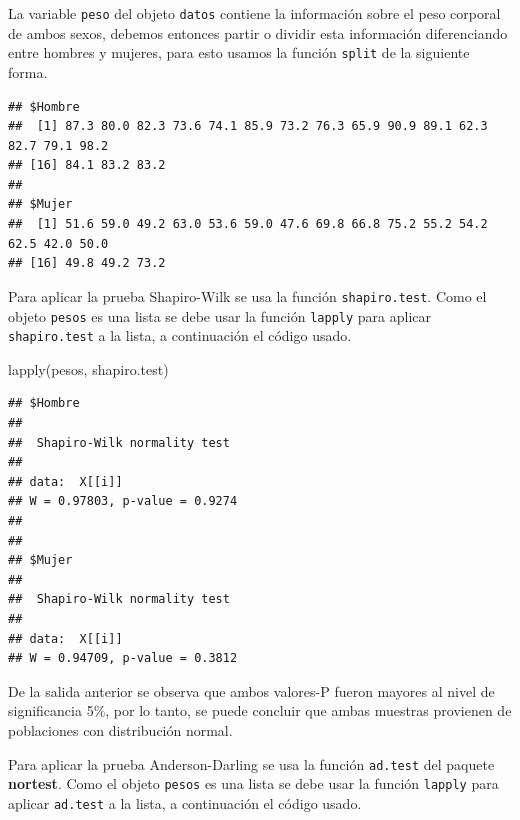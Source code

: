 \documentclass[
]{book}
\makeatletter
\newenvironment{Shaded}{\begin{snugshade}}{\end{snugshade}}
\newcommand{\FunctionTok}[1]{\textcolor[rgb]{0.00,0.00,0.00}{#1}}
\newcommand{\NormalTok}[1]{#1}
\newcommand{\OtherTok}[1]{\textcolor[rgb]{0.56,0.35,0.01}{#1}}
\newcommand{\SpecialCharTok}[1]{\textcolor[rgb]{0.00,0.00,0.00}{#1}}
\newenvironment{kframe}{%
\medskip{}
\setlength{\fboxsep}{.8em}
 \def\at@end@of@kframe{}%
 \ifinner\ifhmode%
  \def\at@end@of@kframe{\end{minipage}}%
  \begin{minipage}{\columnwidth}%
 \fi\fi%
 \def\FrameCommand##1{\hskip\@totalleftmargin \hskip-\fboxsep
 \colorbox{shadecolor}{##1}\hskip-\fboxsep
     \hskip-\linewidth \hskip-\@totalleftmargin \hskip\columnwidth}%
 \MakeFramed {\advance\hsize-\width
   \@totalleftmargin\z@ \linewidth\hsize
   \@setminipage}}%
 {\par\unskip\endMakeFramed%
 \at@end@of@kframe}
\renewenvironment{Shaded}{\begin{kframe}}{\end{kframe}}
\makeatother
\begin{document}
La variable \texttt{peso} del objeto \texttt{datos} contiene la información sobre el peso corporal de ambos sexos, debemos entonces partir o dividir esta información diferenciando entre hombres y mujeres, para esto usamos la función \texttt{split} de la siguiente forma.

\begin{Shaded}
\end{Shaded}

\begin{verbatim}
## $Hombre
##  [1] 87.3 80.0 82.3 73.6 74.1 85.9 73.2 76.3 65.9 90.9 89.1 62.3 82.7 79.1 98.2
## [16] 84.1 83.2 83.2
## 
## $Mujer
##  [1] 51.6 59.0 49.2 63.0 53.6 59.0 47.6 69.8 66.8 75.2 55.2 54.2 62.5 42.0 50.0
## [16] 49.8 49.2 73.2
\end{verbatim}

Para aplicar la prueba Shapiro-Wilk se usa la función \texttt{shapiro.test}. Como el objeto \texttt{pesos} es una lista se debe usar la función \texttt{lapply} para aplicar \texttt{shapiro.test} a la lista, a continuación el código usado.

\begin{Shaded}
\begin{Highlighting}[]
\FunctionTok{lapply}\NormalTok{(pesos, shapiro.test)}
\end{Highlighting}
\end{Shaded}

\begin{verbatim}
## $Hombre
## 
##  Shapiro-Wilk normality test
## 
## data:  X[[i]]
## W = 0.97803, p-value = 0.9274
## 
## 
## $Mujer
## 
##  Shapiro-Wilk normality test
## 
## data:  X[[i]]
## W = 0.94709, p-value = 0.3812
\end{verbatim}

De la salida anterior se observa que ambos valores-P fueron mayores al nivel de significancia 5\%, por lo tanto, se puede concluir que ambas muestras provienen de poblaciones con distribución normal.

Para aplicar la prueba Anderson-Darling se usa la función \texttt{ad.test} del paquete \textbf{nortest}. Como el objeto \texttt{pesos} es una lista se debe usar la función \texttt{lapply} para aplicar \texttt{ad.test} a la lista, a continuación el código usado.
\end{document}
